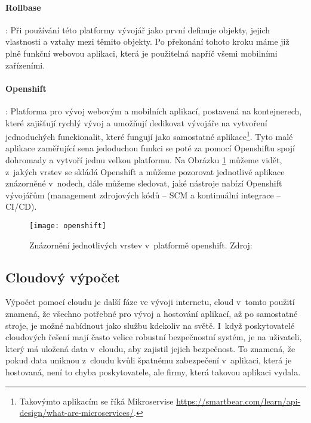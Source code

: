 \paragraph{Rollbase}: Při používání této platformy vývojář jako první definuje objekty, jejich vlastnosti a vztahy mezi těmito objekty. Po překonání tohoto kroku máme již plně funkční webovou aplikaci, která je použitelná napříč všemi mobilními zařízeními. \cite{what-is-low-code}
\paragraph{Openshift}: Platforma pro vývoj webovým a mobilních aplikací, postavená na kontejnerech, které zajišťují rychlý vývoj a umožňují dedikovat vývojáře na vytvoření jednoduchých funckionalit, které fungují jako samostatné aplikace\footnote{Takovýmto aplikacím se říká Mikroservise \url{https://smartbear.com/learn/api-design/what-are-microservices/}.}. Tyto malé aplikace zaměřující sena jedoduchou funkci se poté za pomocí Openshiftu spojí dohromady a vytvoří jednu velkou platformu. Na Obrázku \ref{openshift-vrstvy} můžeme vidět, z~jakých vrstev se skládá Openshift a můžeme pozorovat jednotlivé aplikace znázorněné v~nodech, dále můžeme sledovat, jaké nástroje nabízí Openshift vývojářům (management zdrojových kódů -- SCM a kontinuální integrace -- CI/CD).\cite{openshift-overview}
\begin{figure}[h]
\centering
\texttt{[image: openshift]}
\caption[Jednotlivé vrstev v~platformě openshift]{Znázornění jednotlivých vrstev v~platformě openshift. Zdroj: \cite{openshift-overview}}
\label{openshift-vrstvy}
\end{figure}

\subsection{Cloudový výpočet}
\par Výpočet pomocí cloudu je další fáze ve vývoji internetu, cloud v~tomto použití znamená, že všechno potřebné pro vývoj a hostování aplikací, až po samostatné stroje, je možné nabídnout jako službu kdekoliv na světě. I~když poskytovatelé cloudových řešení mají často velice robustní bezpečnostní systém, je na uživateli, který má uložená data v~cloudu, aby zajistil jejich bezpečnost. To znamená, že pokud data uniknou z~cloudu kvůli špatnému zabezpečení v~aplikaci, která je hostovaná, není to chyba poskytovatele, ale firmy, která takovou aplikaci vydala.\cite{cloud-computing-dummies}

